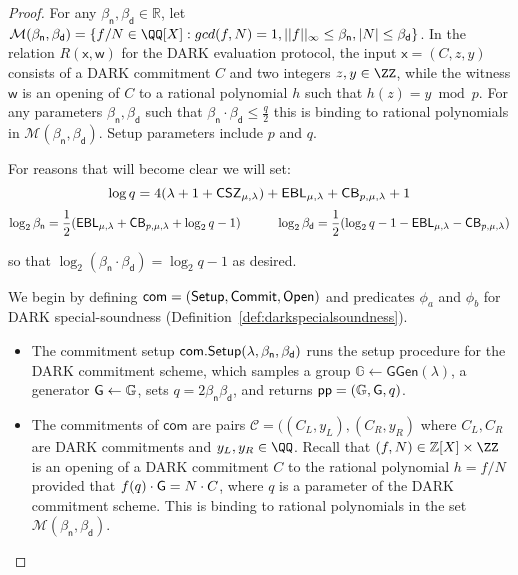\begin{proof} 

For any $\beta_\textsf{n}, \beta_\textsf{d} \in \mathbb{R}$, let $\mathcal{M}(\beta_\textsf{n}, \beta_\textsf{d}) = \{f/N \in \QQ[X]: gcd(f, N) = 1, ||f||_\infty \leq \beta_\textsf{n}, |N| \leq \beta_\textsf{d}\}$. In the relation $R(\mathsf{x}, \mathsf{w})$ for the DARK evaluation protocol, the input $\mathsf{x} = (C, z, y)$ consists of a DARK commitment $C$ and two integers $z, y \in \ZZ$, while the witness $\mathsf{w}$ is an opening of $C$ to a rational polynomial $h$ such that $h(z) = y \bmod p$. For any parameters $\beta_\textsf{n}, \beta_\textsf{d}$ such that $\beta_\textsf{n} \cdot \beta_\textsf{d} \leq \frac{q}{2}$ this is binding to rational polynomials in $\mathcal{M}(\beta_\textsf{n}, \beta_\textsf{d})$. Setup parameters include $p$ and $q$. 

For reasons that will become clear we will set: 
$$\log q = 4(\lambda + 1 + \CSZ[\mu]) + \EBL[\mu] + \CorrectnessBound + 1$$
$$\log_2 \beta_\textsf{n} = \frac{1}{2} (\mathsf{EBL}_{\mu, \lambda} + \mathsf{CB}_{p, \mu, \lambda} + \log_2 q - 1) \hspace{10mm} \log_2 \beta_\textsf{d} = \frac{1}{2} (\log_2 q - 1 - \mathsf{EBL}_{\mu, \lambda} -  \mathsf{CB}_{p, \mu, \lambda}) $$

so that $\log_2 (\beta_\textsf{n} \cdot \beta_{\textsf{d}}) = \log_2 q - 1$ as desired. 
\medskip 

We begin by defining $\textsf{com} = (\setup, \textsf{Commit}, \open)$ and predicates $\phi_a$ and $\phi_b$ for DARK special-soundness (Definition~\ref{def:darkspecialsoundness}). %
 
\begin{itemize} 
\item The commitment setup $\textsf{com}.\setup(\lambda, \beta_\textsf{n}, \beta_\textsf{d})$ runs the setup procedure for the DARK commitment scheme, which samples a group $\mathbb{G} \gets \textsf{GGen}(\lambda)$, a generator $\gr{G} \gets \mathbb{G}$, sets $q = 2 \beta_\textsf{n} \beta_\textsf{d}$, and returns $\crs = (\mathbb{G}, \gr{G}, q)$. 
\item The commitments of $\textsf{com}$ are pairs $\mathcal{C} = ((C_L, y_L), (C_R, y_R)$ where $C_L, C_R$ are DARK commitments and $y_L, y_R \in \QQ$. Recall that $(f, N) \in \mathbb{Z}[X] \times \ZZ$ is an opening of a DARK commitment $C$ to the rational polynomial $h = f/N$ provided that  $f(q) \cdot \gr{G} = N \cdot C$, where $q$ is a parameter of the DARK commitment scheme. This is binding to rational polynomials in the set $\mathcal{M}(\beta_\textsf{n}, \beta_\textsf{d})$.


\end{itemize}
\end{proof}
